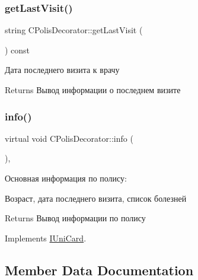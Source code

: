 \subsubsection{\texorpdfstring{get\+Last\+Visit()}{getLastVisit()}}
{\footnotesize\ttfamily string C\+Polis\+Decorator\+::get\+Last\+Visit (\begin{DoxyParamCaption}{ }\end{DoxyParamCaption}) const\hspace{0.3cm}{\ttfamily [inline]}}



Дата последнего визита к врачу 

\begin{DoxyReturn}{Returns}
Вывод информации о последнем визите 
\end{DoxyReturn}
\mbox{\label{classCPolisDecorator_a3e5c7651e0db69bfcc4a9b67e961b9a8}} 
\subsubsection{\texorpdfstring{info()}{info()}}
{\footnotesize\ttfamily virtual void C\+Polis\+Decorator\+::info (\begin{DoxyParamCaption}{ }\end{DoxyParamCaption})\hspace{0.3cm}{\ttfamily [inline]}, {\ttfamily [virtual]}}



Основная информация по полису\+: 

Возраст, дата последнего визита, список болезней \begin{DoxyReturn}{Returns}
Вывод информации по полису 
\end{DoxyReturn}


Implements \hyperlink{classIUniCard}{I\+Uni\+Card}.



\subsection{Member Data Documentation}
\mbox{\label{classCPolisDecorator_a06749afa01826039c719984b3728860a}} 
